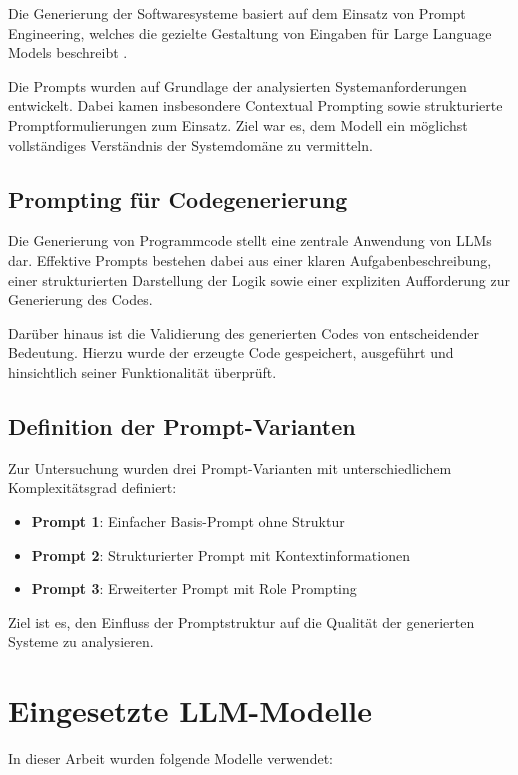 Die Generierung der Softwaresysteme basiert auf dem
Einsatz von Prompt Engineering, welches die gezielte
Gestaltung von Eingaben für Large Language Models
beschreibt \cite{boonstra2024prompt}.

Die Prompts wurden auf Grundlage der analysierten
Systemanforderungen entwickelt. Dabei kamen insbesondere
Contextual Prompting sowie strukturierte
Promptformulierungen zum Einsatz. Ziel war es, dem Modell
ein möglichst vollständiges Verständnis der Systemdomäne
zu vermitteln.


\subsection{Prompting für Codegenerierung}


Die Generierung von Programmcode stellt eine zentrale
Anwendung von LLMs dar. Effektive Prompts bestehen dabei
aus einer klaren Aufgabenbeschreibung, einer strukturierten
Darstellung der Logik sowie einer expliziten Aufforderung
zur Generierung des Codes.

Darüber hinaus ist die Validierung des generierten Codes
von entscheidender Bedeutung. Hierzu wurde der erzeugte
Code gespeichert, ausgeführt und hinsichtlich seiner
Funktionalität überprüft.

\subsection{Definition der Prompt-Varianten}

Zur Untersuchung wurden drei Prompt-Varianten mit
unterschiedlichem Komplexitätsgrad definiert:

\begin{itemize}
\item \textbf{Prompt 1}: Einfacher Basis-Prompt ohne Struktur
\item \textbf{Prompt 2}: Strukturierter Prompt mit Kontextinformationen
\item \textbf{Prompt 3}: Erweiterter Prompt mit Role Prompting
\end{itemize}

Ziel ist es, den Einfluss der Promptstruktur auf die
Qualität der generierten Systeme zu analysieren.

\section{Eingesetzte LLM-Modelle}

In dieser Arbeit wurden folgende Modelle verwendet:

